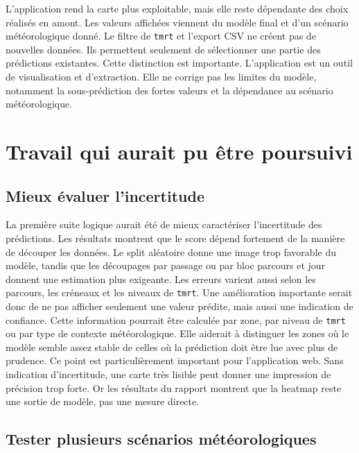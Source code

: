 \documentclass{article}
\begin{document}
L'application rend la carte plus exploitable, mais elle reste dépendante des choix réalisés en amont. Les valeurs affichées viennent du modèle final et d'un scénario météorologique donné. Le filtre de \texttt{tmrt} et l'export CSV ne créent pas de nouvelles données. Ils permettent seulement de sélectionner une partie des prédictions existantes.
Cette distinction est importante. L'application est un outil de visualisation et d'extraction. Elle ne corrige pas les limites du modèle, notamment la sous-prédiction des fortes valeurs et la dépendance au scénario météorologique.

\newpage

\section{Travail qui aurait pu être poursuivi}

\subsection{Mieux évaluer l'incertitude}

La première suite logique aurait été de mieux caractériser l'incertitude des prédictions. Les résultats montrent que le score dépend fortement de la manière de découper les données. Le split aléatoire donne une image trop favorable du modèle, tandis que les découpages par passage ou par bloc parcours et jour donnent une estimation plus exigeante. Les erreurs varient aussi selon les parcours, les créneaux et les niveaux de \texttt{tmrt}.
Une amélioration importante serait donc de ne pas afficher seulement une valeur prédite, mais aussi une indication de confiance. Cette information pourrait être calculée par zone, par niveau de \texttt{tmrt} ou par type de contexte météorologique. Elle aiderait à distinguer les zones où le modèle semble assez stable de celles où la prédiction doit être lue avec plus de prudence.
Ce point est particulièrement important pour l'application web. Sans indication d'incertitude, une carte très lisible peut donner une impression de précision trop forte. Or les résultats du rapport montrent que la heatmap reste une sortie de modèle, pas une mesure directe.

\subsection{Tester plusieurs scénarios météorologiques}
\end{document}
